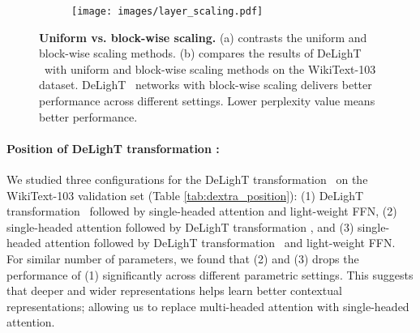 \begin{figure}[t!]
    \centering
    \begin{subfigure}[b]{0.5\columnwidth}
        \centering
        \resizebox{!}{120px}{
            \scaling
        }
        \caption{}
    \end{subfigure}
    \hfill
    \begin{subfigure}[b]{0.48\columnwidth}
        \texttt{[image: images/layer\_scaling.pdf]}
        \caption{}
    \end{subfigure}
    \caption{\textbf{Uniform vs. block-wise scaling.} (a) contrasts the uniform and block-wise scaling methods. (b) compares the results of DeLighT ~with uniform and block-wise scaling methods on the WikiText-103 dataset. DeLighT ~networks with block-wise scaling delivers better performance across different settings. Lower perplexity value means better performance.}
    \label{fig:appendix_block_unifrom}
\end{figure}

\paragraph{Position of DeLighT transformation :}
We studied three configurations for the DeLighT transformation ~on the WikiText-103 validation set (Table \ref{tab:dextra_position}): (1) DeLighT transformation ~followed by single-headed attention and light-weight FFN, (2) single-headed attention followed by DeLighT transformation , and (3) single-headed attention followed by DeLighT transformation ~and light-weight FFN. For similar number of parameters, we found that (2) and (3) drops the performance of (1) significantly across different parametric settings. This suggests that deeper and wider representations helps learn better contextual representations; allowing us to replace multi-headed attention with single-headed attention.

